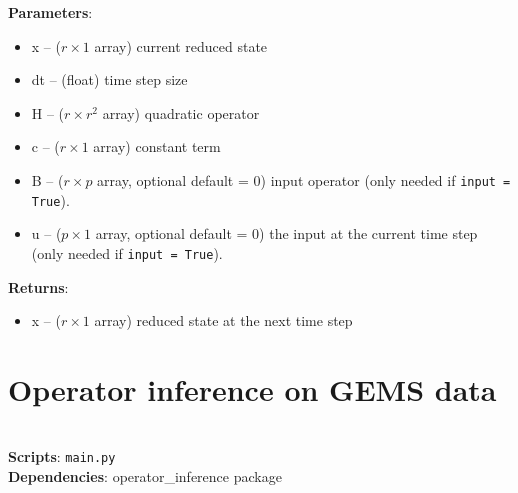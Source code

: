 \documentclass[11pt]{article} %
\newcommand{\code}[1]{\colorbox{light-gray}{\texttt{#1}}}
\begin{document}
\begin{enumerate}
\textbf{Parameters}:
	\begin{itemize}
	\item[] x -- ($r\times 1$ array) current reduced state 
	\item[] dt -- (float) time step size
	\item[] H -- ($r \times r^2$ array) quadratic operator
	\item[] c -- ($r \times 1$ array) constant term
	\item[] B -- ($r \times p$ array, optional default = 0) input operator (only needed if \code{input = True}).
	\item[] u -- ($p \times 1$ array, optional default = 0) the input at the current time step (only needed if \code{input = True}).
	\end{itemize}
\textbf{Returns}:
\begin{itemize}
\item[] x -- ($r \times 1$ array) reduced state at the next time step
\end{itemize}
\end{enumerate}
\newpage
\section{Operator inference on GEMS data}
\hrulefill\\
\textbf{Scripts}: \code{main.py}\\
\textbf{Dependencies}: operator\_inference package

\noindent\hrulefill\\
\end{document}
